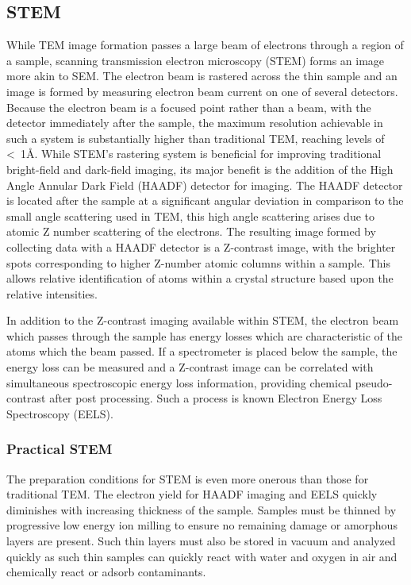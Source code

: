 \subsection{STEM} While TEM image formation passes a large beam of electrons through a region of a sample, scanning transmission electron microscopy (STEM) forms an image more akin to SEM. The electron beam is rastered across the thin sample and an image is formed by measuring electron beam current on one of several detectors.
Because the electron beam is a focused point rather than a beam, with the detector immediately after the sample, the maximum resolution achievable in such a system is substantially higher than traditional TEM, reaching levels of <~1\AA{}.
While STEM's rastering system is beneficial for improving traditional bright-field and dark-field imaging, its major benefit is the addition of the High Angle Annular Dark Field (HAADF) detector for imaging.
The HAADF detector is located after the sample at a significant angular deviation in comparison to the small angle scattering used in TEM, this high angle scattering arises due to atomic Z number scattering of the electrons.
The resulting image formed by collecting data with a HAADF detector is a Z-contrast image, with the brighter spots corresponding to higher Z-number atomic columns within a sample.
This allows relative identification of atoms within a crystal structure based upon the relative intensities.

In addition to the Z-contrast imaging available within STEM, the electron beam which passes through the sample has energy losses which are characteristic of the atoms which the beam passed.
If a spectrometer is placed below the sample, the energy loss can be measured and a Z-contrast image can be correlated with simultaneous spectroscopic energy loss information, providing chemical pseudo-contrast after post processing.
Such a process is known Electron Energy Loss Spectroscopy (EELS).

\subsubsection{Practical STEM} The preparation conditions for STEM is even more onerous than those for traditional TEM. The electron yield for HAADF imaging and EELS quickly diminishes with increasing thickness of the sample.
Samples must be thinned by progressive low energy ion milling to ensure no remaining damage or amorphous layers are present.
Such thin layers must also be stored in vacuum and analyzed quickly as such thin samples can quickly react with water and oxygen in air and chemically react or adsorb contaminants.

